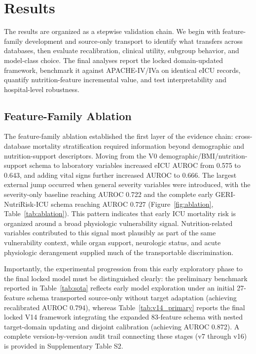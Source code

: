 \documentclass[utf8]{FrontiersinVancouver}
\newcommand{\re}[1]{#1}
\begin{document}
\section{Results}

The results are organized as a stepwise validation chain. We begin with feature-family development and source-only transport to identify what transfers across databases, then evaluate recalibration, clinical utility, subgroup behavior, and model-class choice. The final analyses report the locked domain-updated framework, benchmark it against APACHE-IV/IVa on identical eICU records, quantify nutrition-feature incremental value, and test interpretability and hospital-level robustness.

\subsection{Feature-Family Ablation}
The feature-family ablation established the first layer of the evidence chain: cross-database mortality stratification required information beyond demographic and nutrition-support descriptors. Moving from the V0 demographic/BMI/nutrition-support schema to laboratory variables increased eICU AUROC from 0.575 to 0.643, and adding vital signs further increased AUROC to 0.666. The largest external jump occurred when general severity variables were introduced, with the severity-only baseline reaching AUROC 0.722 and the complete early GERI-NutriRisk-ICU schema reaching AUROC 0.727 (Figure~\ref{fig:ablation}, Table~\ref{tab:ablation}). This pattern indicates that early ICU mortality risk is organized around a broad physiologic vulnerability signal. Nutrition-related variables contributed to this signal most plausibly as part of the same vulnerability context, while organ support, neurologic status, and acute physiologic derangement supplied much of the transportable discrimination.

\re{Importantly, the experimental progression from this early exploratory phase to the final locked model must be distinguished clearly: the preliminary benchmark reported in Table~\ref{tab:sota} reflects early model exploration under an initial 27-feature schema transported source-only without target adaptation (achieving recalibrated AUROC 0.794), whereas Table~\ref{tab:v14_primary} reports the final locked V14 framework integrating the expanded 83-feature schema with nested target-domain updating and disjoint calibration (achieving AUROC 0.872). A complete version-by-version audit trail connecting these stages (v7 through v16) is provided in Supplementary Table S2.}
\end{document}
